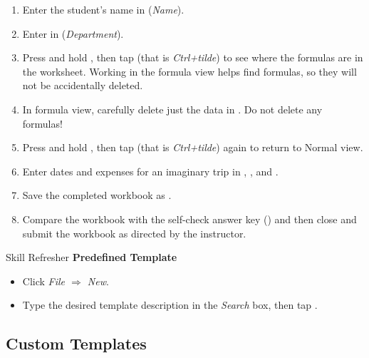 \begin{enumbox}
	\begin{enumerate}
		\item Enter the student's name in  (\textit{Name}).
		\item Enter  in  (\textit{Department}).
		\item Press and hold , then tap \fmtKeystroke{$ \sim $} (that is \textit{Ctrl+tilde}) to see where the formulas are in the worksheet. Working in the formula view helps find formulas, so they will not be accidentally deleted.
		\item In formula view, carefully delete just the data in . Do not delete any formulas!
		\item Press and hold , then tap \fmtKeystroke{$ \sim $} (that is \textit{Ctrl+tilde}) again to return to Normal view.
		\item Enter dates and expenses for an imaginary trip in , , and .
		\item Save the completed workbook as .
		\item Compare the workbook with the self-check answer key () and then close and submit the  workbook as directed by the instructor.
	\end{enumerate}
\end{enumbox}

\begin{center}
	\begin{sklbox}{Skill Refresher}
		\textbf{Predefined Template}
		\\
		\begin{itemize}
			\setlength{\itemsep}{0pt}
			\setlength{\parskip}{0pt}
			\setlength{\parsep}{0pt}

			\item Click \textit{File $ \Rightarrow $ New}.
			\item Type the desired template description in the \textit{Search} box, then tap .
			
		\end{itemize}
	\end{sklbox}
\end{center}

\subsection{Custom Templates}

